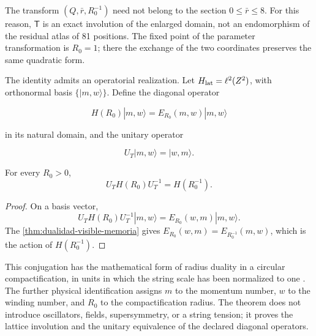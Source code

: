 The transform \((Q,\bar r,R_0^{-1})\) need not belong to the
section \(0\leq\bar r\leq8\). For this reason, \(\mathsf T\) is an
exact involution of the enlarged domain, not an endomorphism of the residual atlas
of 81 positions. The fixed point of the parameter transformation is
\(R_0=1\); there the exchange of the two coordinates preserves the same
quadratic form.

The identity admits an operatorial realization. Let
\(\mathcal H_{\rm lat}=\ell^2(\mathbb Z^2)\), with orthonormal basis
\(\{|m,w\rangle\}\). Define the diagonal operator

\[
H(R_0)|m,w\rangle=E_{R_0}(m,w)|m,w\rangle
\]

in its natural domain, and the unitary operator

\[
U_T|m,w\rangle=|w,m\rangle.
\]

\begin{corollary}
\label{cor:dualidad-unitaria}
For every \(R_0>0\),
\[
U_TH(R_0)U_T^{-1}=H(R_0^{-1}).
\]
\end{corollary}

\begin{proof}
On a basis vector,
\[
U_TH(R_0)U_T^{-1}|m,w\rangle
=E_{R_0}(w,m)|m,w\rangle.
\]
The \cref{thm:dualidad-visible-memoria} gives
\(E_{R_0}(w,m)=E_{R_0^{-1}}(m,w)\), which is the action of
\(H(R_0^{-1})\).
\end{proof}

This conjugation has the mathematical form of radius duality in a circular compactification, in units in which the string scale has been normalized to one \cite{Giveon1994}. The further physical identification assigns \(m\) to the momentum number, \(w\) to the winding number, and \(R_0\) to the compactification radius. The theorem does not introduce oscillators, fields, supersymmetry, or a string tension; it proves the lattice involution and the unitary equivalence of the declared diagonal operators.
